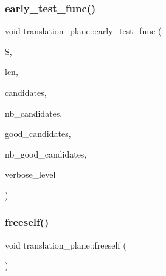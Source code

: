 \subsubsection{\texorpdfstring{early\+\_\+test\+\_\+func()}{early\_test\_func()}}
{\footnotesize\ttfamily void translation\+\_\+plane\+::early\+\_\+test\+\_\+func (\begin{DoxyParamCaption}\item[{\mbox{\hyperlink{galois_8h_a09fddde158a3a20bd2dcadb609de11dc}{I\+NT}} $\ast$}]{S,  }\item[{\mbox{\hyperlink{galois_8h_a09fddde158a3a20bd2dcadb609de11dc}{I\+NT}}}]{len,  }\item[{\mbox{\hyperlink{galois_8h_a09fddde158a3a20bd2dcadb609de11dc}{I\+NT}} $\ast$}]{candidates,  }\item[{\mbox{\hyperlink{galois_8h_a09fddde158a3a20bd2dcadb609de11dc}{I\+NT}}}]{nb\+\_\+candidates,  }\item[{\mbox{\hyperlink{galois_8h_a09fddde158a3a20bd2dcadb609de11dc}{I\+NT}} $\ast$}]{good\+\_\+candidates,  }\item[{\mbox{\hyperlink{galois_8h_a09fddde158a3a20bd2dcadb609de11dc}{I\+NT}} \&}]{nb\+\_\+good\+\_\+candidates,  }\item[{\mbox{\hyperlink{galois_8h_a09fddde158a3a20bd2dcadb609de11dc}{I\+NT}}}]{verbose\+\_\+level }\end{DoxyParamCaption})}

\mbox{\label{classtranslation__plane_a1d01b522aea53c628d79e71970fa2818}} 
\subsubsection{\texorpdfstring{freeself()}{freeself()}}
{\footnotesize\ttfamily void translation\+\_\+plane\+::freeself (\begin{DoxyParamCaption}{ }\end{DoxyParamCaption})}

\mbox{\label{classtranslation__plane_a80a5ccd18f0156a98fb51c8ce79b619a}} 
